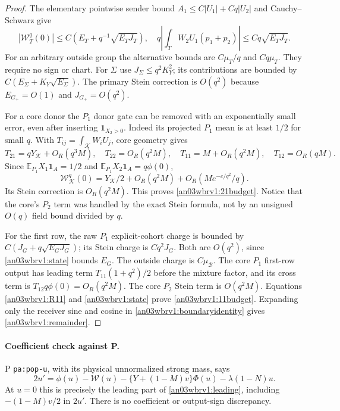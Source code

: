 \documentclass[11pt]{article}
\numberwithin{equation}{section}
\theoremstyle{remark}\newtheorem{remark}[theorem]{Remark}
\newcommand{\E}{\mathbb E}\newcommand{\dd}{\,d}
\newcommand{\one}{\mathbf1}\newcommand{\KK}{\mathcal K}
\newcommand{\BB}{\mathcal B}\newcommand{\Gp}{{G_+}}
\newcommand{\ph}{\phi(0)}\newcommand{\WW}{\mathcal W}
\begin{document}
\begin{proof}
The elementary pointwise sender bound
$A_1\le C|U_1|+Cq|U_2|$ and Cauchy--Schwarz give
\begin{equation}
 |\WW_T^q(0)|\le C(E_T+q^{-1}\sqrt{E_TJ_T}),\quad
 q\left|\int_TW_2U_1(p_1+p_2)\right|\le Cq\sqrt{E_TJ_T}.
 \label{an03wbrv1:energycharge}
\end{equation}
For an arbitrary outside group the alternative bounds are
$C\mu_T/q$ and $Cq\mu_T$. They require no sign or chart.
For $\Sigma$ use $J_\Sigma\le q^2K_Y^2$; its contributions are
bounded by $C(E_\Sigma+K_Y\sqrt{E_\Sigma})$.
The primary Stein correction is $O(q^2)$ because
$E_\Gp=O(1)$ and $J_\Gp=O(q^2)$.

For a core donor the $P_1$ donor gate can be removed with an
exponentially small error, even after inserting $\one_{X_2>0}$.
Indeed its projected $P_1$ mean is at least $1/2$ for small $q$.
With $T_{ij}=\int_\KK W_iU_j$, core geometry gives
\[
 T_{21}=qY_\KK+O_R(q^3M),\quad T_{22}=O_R(q^2M),
 \quad T_{11}=M+O_R(q^2M),\quad T_{12}=O_R(qM).
\]
Since $\E_{P_1}X_1\one_A=1/2$ and
$\E_{P_1}X_2\one_A=q\ph$,
\[
 \WW_\KK^q(0)=Y_\KK/2+O_R(q^2M)+O_R(Me^{-c/q^2}/q).
\]
Its Stein correction is $O_R(q^2M)$. This proves
\eqref{an03wbrv1:21budget}. Notice that the core's $P_2$ term was
handled by the exact Stein formula, not by an unsigned $O(q)$ field
bound divided by $q$.

For the first row, the raw $P_1$ explicit-cohort charge is bounded by
$C(J_G+q\sqrt{E_GJ_G})$; its Stein charge is $Cq^2J_G$.
Both are $O(q^2)$, since \eqref{an03wbrv1:state} bounds $E_G$.
The outside charge is $C\mu_\BB$. The core $P_1$ first-row output
has leading term $T_{11}(1+q^2)/2$ before the mixture factor,
and its cross term is $T_{12}q\ph=O_R(q^2M)$.
The core $P_2$ Stein term is $O(q^2M)$.
Equations \eqref{an03wbrv1:R11} and \eqref{an03wbrv1:state} prove
\eqref{an03wbrv1:11budget}. Expanding only the receiver sine and
cosine in \eqref{an03wbrv1:boundaryidentity} gives
\eqref{an03wbrv1:remainder}.
\end{proof}

\paragraph{Coefficient check against P.}
P \texttt{pa:pop-u}, with its physical unnormalized strong mass, says
\[
 2u'=\phi(u)-\WW(u)-\{Y+(1-M)v\}\Phi(u)-\lambda(1-N)u.
\]
At $u=0$ this is precisely the leading part of
\eqref{an03wbrv1:leading}, including $-(1-M)v/2$ in $2u'$.
There is no coefficient or output-sign discrepancy.
\end{document}
